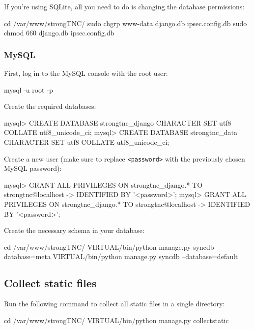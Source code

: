 If you're using SQLite, all you need to do is changing the database permissions:

\begin{bashcode}
cd /var/www/strongTNC/
sudo chgrp www-data django.db ipsec.config.db
sudo chmod 660 django.db ipsec.config.db
\end{bashcode}

\subsubsection*{MySQL}

First, log in to the MySQL console with the root user:

\begin{bashcode}
mysql -u root -p
\end{bashcode}

Create the required databases:

\begin{sqlcode}
mysql> CREATE DATABASE strongtnc_django CHARACTER SET utf8 COLLATE utf8_unicode_ci;
mysql> CREATE DATABASE strongtnc_data CHARACTER SET utf8 COLLATE utf8_unicode_ci;
\end{sqlcode}

Create a new user (make sure to replace \texttt{<password>} with the previously
chosen MySQL password):

\begin{sqlcode}
mysql> GRANT ALL PRIVILEGES ON strongtnc_django.* TO strongtnc@localhost
-> IDENTIFIED BY '<password>';
mysql> GRANT ALL PRIVILEGES ON strongtnc_django.* TO strongtnc@localhost
-> IDENTIFIED BY '<password>';
\end{sqlcode}

Create the necessary schema in your database:

\begin{bashcode}
cd /var/www/strongTNC/
VIRTUAL/bin/python manage.py syncdb --database=meta
VIRTUAL/bin/python manage.py syncdb --database=default
\end{bashcode}

\subsection*{Collect static files}

Run the following command to collect all static files in a single directory:

\begin{bashcode}
cd /var/www/strongTNC/
VIRTUAL/bin/python manage.py collectstatic
\end{bashcode}

